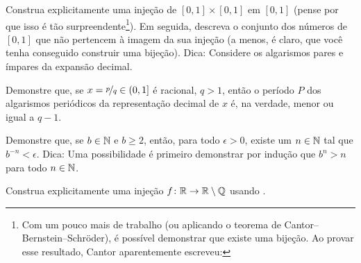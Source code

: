 \begin{exercise}[Desafiador]
Construa explicitamente uma injeção de $[0,1] \times [0,1]$ em $[0,1]$ (pense por que
isso é tão surpreendente\footnote{%
Com um pouco mais de trabalho (ou aplicando o
teorema de Cantor--Bernstein--Schr\"oder),
é possível demonstrar que existe uma bijeção.
Ao provar esse resultado, Cantor aparentemente escreveu:
}).
Em seguida, descreva o conjunto dos números de $[0,1]$ que não pertencem à imagem da sua
injeção (a menos, é claro, que você tenha conseguido construir uma bijeção).
Dica: Considere os algarismos pares e ímpares da expansão decimal.
\end{exercise}

\begin{exercise}
Demonstre que, se $x = \nicefrac{p}{q} \in (0,1]$ é racional, $q > 1$,
então o período $P$ dos algarismos periódicos da representação decimal
de $x$ é, na verdade, menor ou igual a $q-1$.
\end{exercise}

\begin{exercise} \label{exercise:bnlimit}
Demonstre que, se $b \in {\mathbb{N}}$ e $b \geq 2$, então, para todo $\epsilon > 0$,
existe um $n \in {\mathbb{N}}$ tal que
$b^{-n} < \epsilon$. Dica:
Uma possibilidade é primeiro demonstrar por indução que $b^n > n$ para todo $n \in {\mathbb{N}}$.
\end{exercise}

\begin{exercise}
Construa explicitamente uma injeção $f \colon {\mathbb{R}} \to {\mathbb{R}} \setminus {\mathbb{Q}}$ usando
.
\end{exercise}
